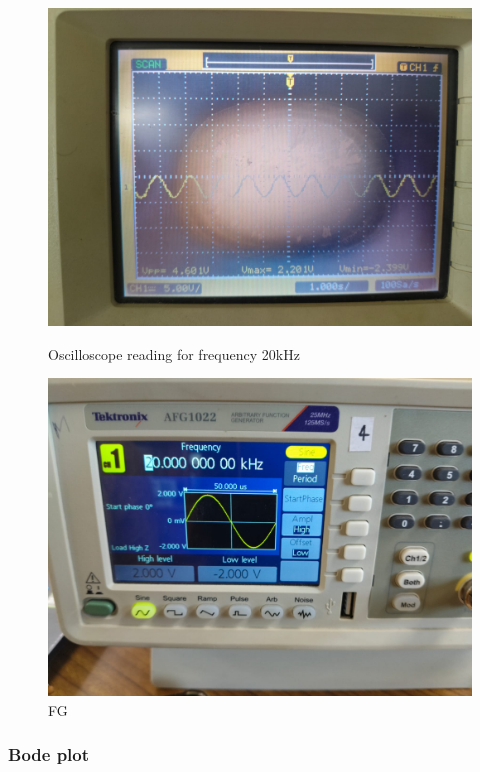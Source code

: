 \documentclass[a4paper,12pt]{article}
\begin{document}
\begin{figure}[H]
    \centering
    \begin{minipage}[b]{0.45\textwidth}
        \centering
        \includegraphics[width=\textwidth]{fig/hp/20ko.jpeg}
        \caption{Oscilloscope reading for frequency 20kHz}
    \end{minipage}
    \hfill
    \begin{minipage}[b]{0.45\textwidth}
        \centering
        \includegraphics[width=\textwidth]{fig/hp/20k.jpeg}
        \caption{FG}
    \end{minipage}
\end{figure}
\subsubsection{Bode plot}
\end{document}
